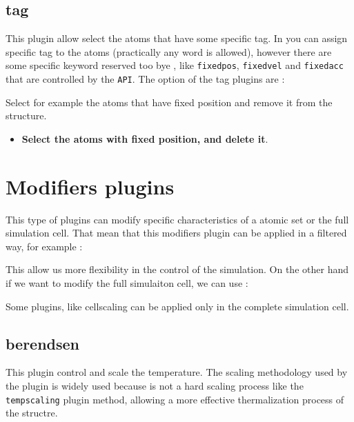 \subsection{tag}
This plugin allow select the atoms that have some specific tag. In {\lpmd} you
can assign specific tag to the atoms (practically any word is allowed), however
there are some specific keyword reserved too bye {\lpmd}, like \verb|fixedpos|,
\verb|fixedvel| and \verb|fixedacc| that are controlled by the \texttt{API}.
The option of the tag plugins are :


Select for example the atoms that have fixed position and remove it from the
structure.

\begin{itemize}
 \item \textbf{Select the atoms with fixed position, and delete it}.
\end{itemize}

\section{Modifiers plugins}
This type of plugins can modify specific characteristics of a atomic set or the
full simulation cell. That mean that this modifiers plugin can be applied in a
filtered way, for example :


This allow us more flexibility in the control of the simulation. On the other
hand if we want to modify the full simulaiton cell, we can use : 


Some plugins, like cellscaling can be applied only in the complete
simulation cell.

\subsection{berendsen}
This plugin control and scale the temperature. The scaling methodology used by
the plugin is widely used because is not a hard scaling process like the
\verb|tempscaling| plugin method, allowing a more effective thermalization
process of the structre. 


